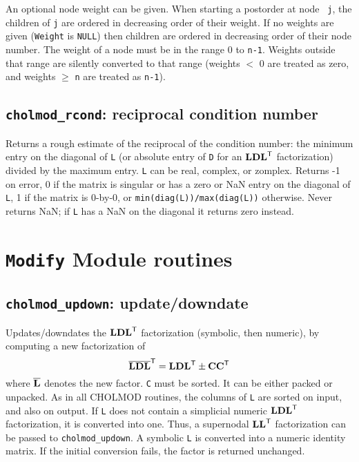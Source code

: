 \documentclass[11pt]{article}
\newcommand{\m}[1]{{\bf{#1}}}       %
\newcommand{\tr}{^{\sf T}}          %
\newcommand{\new}[1]{\overline{#1}}
\begin{document}
An optional node weight can be given.  When starting a postorder at node {\tt
j}, the children of {\tt j} are ordered in decreasing order of their weight.
If no weights are given ({\tt Weight} is {\tt NULL}) then children are ordered
in decreasing order of their node number.  The weight of a node must be in the
range 0 to {\tt n-1}.  Weights outside that range are silently converted to
that range (weights $<$ 0 are treated as zero, and weights $\ge$ {\tt n} are
treated as {\tt n-1}).

\subsection{{\tt cholmod\_rcond}: reciprocal condition number}


Returns a rough estimate of the reciprocal of the condition number: the minimum
entry on the diagonal of {\tt L} (or absolute entry of {\tt D} for an
$\m{LDL}\tr$ factorization) divided by the maximum entry.  {\tt L} can be real,
complex, or zomplex.  Returns -1 on error, 0 if the matrix is singular or has a
zero or NaN entry on the diagonal of {\tt L}, 1 if the matrix is 0-by-0, or
{\tt min(diag(L))/max(diag(L))} otherwise.  Never returns NaN; if {\tt L} has a
NaN on the diagonal it returns zero instead.

\newpage \section{{\tt Modify} Module routines}

\subsection{{\tt cholmod\_updown}: update/downdate}


Updates/downdates the $\m{LDL}\tr$ factorization (symbolic, then numeric), by
computing a new factorization of
\[
\new{\m{L}}\new{\m{D}}\new{\m{L}}\tr = \m{LDL}\tr \pm \m{CC}\tr
\]
where $\new{\m{L}}$ denotes the new factor.  {\tt C} must be sorted.  It can be
either packed or unpacked.  As in all CHOLMOD routines, the columns of {\tt L}
are sorted on input, and also on output.  If {\tt L} does not contain a
simplicial numeric $\m{LDL}\tr$ factorization, it is converted into one.  Thus,
a supernodal $\m{LL}\tr$ factorization can be passed to {\tt cholmod\_updown}.
A symbolic {\tt L} is converted into a numeric identity matrix.  If the initial
conversion fails, the factor is returned unchanged.
\end{document}
